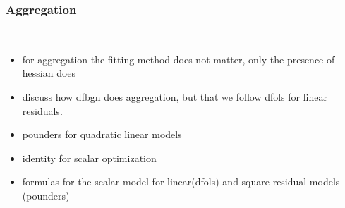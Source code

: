 \subsubsection{Aggregation}
\label{subsubsec:aggregation}
\hfill\\


\begin{itemize}
    \item for aggregation the fitting method does not matter, only the presence of hessian does
    \item discuss how dfbgn does aggregation, but that we follow dfols for linear residuals.
    \item pounders for quadratic linear models
    \item identity for scalar optimization
    \item formulas for the scalar model for linear(dfols) and square residual models (pounders)
\end{itemize}
